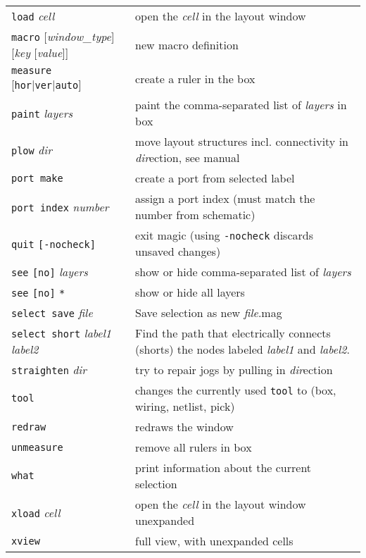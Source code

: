 \documentclass[10pt,a4paper]{article}
\newcommand{\mac}[1]{\texttt{#1}}
\newcommand{\argu}[1]{\textit{#1}}
\newcommand{\mouse}[1]{\texttt{#1}}
\begin{document}
\begin{tabular}{p{}p{}}
		\mac{load} \argu{cell} & open the \argu{cell} in the layout window\\
		\mac{macro} [\argu{window\_type}] [\argu{key} [\argu{value}]] & new macro definition \\
		\mac{measure} [\mac{hor}|\mac{ver}|\mac{auto}] & create a ruler in the box\\
		\mac{paint} \argu{layers} & paint the comma-separated list of \argu{layers} in box\\
		\mac{plow} \argu{dir} & move layout structures incl. connectivity in \argu{dir}ection, see manual\\
		\mac{port make} & create a port from selected label\\
		\mac{port index} \argu{number} & assign a port index (must match the number from schematic)\\ 
		\mac{quit} \mac{[-nocheck]} & exit magic (using \mac{-nocheck} discards unsaved changes)\\
		\mac{see} \mac{[no]} \argu{layers} & show or hide comma-separated list of \argu{layers}\\
		\mac{see} \mac{[no]} \mac{*} & show or hide all layers\\
		\mac{select save} \argu{file} & Save selection as new \argu{file}.mag\\
		\mac{select short} \argu{label1} \argu{label2} & Find the path that electrically connects (shorts) the nodes labeled \argu{label1} and \argu{label2}.\\
		\mac{straighten} \argu{dir} & try to repair jogs by pulling in \argu{dir}ection\\
		\mac{tool} & changes the currently used \mouse{tool} to (box, wiring, netlist, pick)\\
		\mac{redraw} & redraws the window\\
		\mac{unmeasure} & remove all rulers in box\\
		\mac{what} & print information about the current selection\\
		\mac{xload} \argu{cell} & open the \argu{cell} in the layout window unexpanded\\
		\mac{xview} & full view, with unexpanded cells\\
		\bottomrule
	\end{tabular}
	
	\newpage
\end{document}
